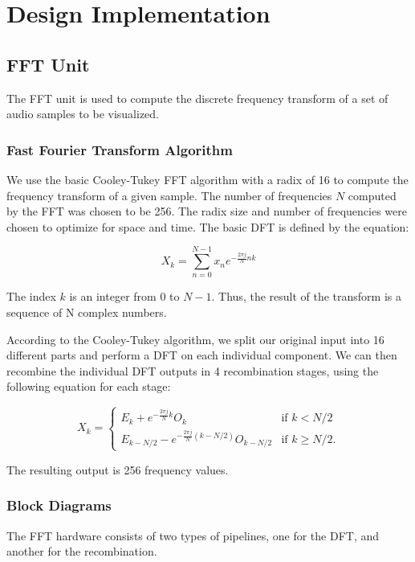 \documentclass{article}
\begin{document}
\section{Design Implementation}
\subsection{FFT Unit}
The FFT unit is used to compute the discrete frequency transform of a set of audio
samples to be visualized. 

\subsubsection{Fast Fourier Transform Algorithm}
We use the basic Cooley-Tukey FFT algorithm with a radix of 16 to compute the
frequency transform of a given sample. The number of frequencies \(N\) computed by 
the FFT was chosen to be 256. The radix size and number of frequencies were chosen 
to optimize for space and time. The basic DFT is defined by the equation:

\begin{equation}
	X_k = \sum_{n=0}^{N-1} x_n e^{-\frac{2\pi j}{N} nk}
\end{equation}

The index \(k\) is an integer from 0 to \(N - 1\). Thus, the result of the
transform is a sequence of N complex numbers.

According to the Cooley-Tukey algorithm, we split our original input into 
16 different parts and perform a DFT on each individual component. We can then 
recombine the individual DFT outputs in 4 recombination stages, using the 
following equation for each stage: 

\begin{equation}
	X_k = \left\{
	\begin{matrix}
		E_k + e^{-\frac{2\pi j}{N}k} O_k		& 	\mbox{if } k < N/2 \\ 
		E_{k-N/2} - e^{-\frac{2\pi j}{N} (k-N/2)} O_{k-N/2} & 	\mbox{if }
		k \geq N/2. 
	\end{matrix} 
	\right.
\end{equation}

The resulting output is 256 frequency values.

\subsubsection{Block Diagrams}

The FFT hardware consists of two types of pipelines, one for the DFT,
and another for the recombination. 
\end{document}
